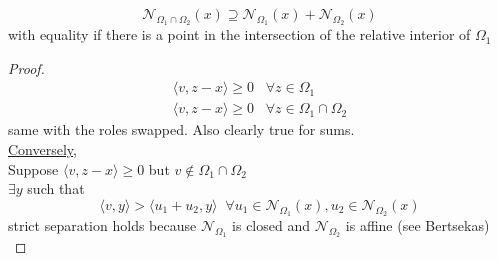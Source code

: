 
 
 


 
 
  \begin{proposition}
 $$ \mathcal{N}_{\Omega_1 \cap \Omega_2}(x) \supseteq \mathcal{N}_{\Omega_1}(x) + \mathcal{N}_{\Omega_2}(x)  $$
 with equality if there is  a point in the intersection of the relative interior of $\Omega_1$
  \end{proposition}
\begin{proof} 
\begin{align*}
\langle v, z - x \rangle \geq 0 \;\;\; \forall z \in \Omega_1\\
\langle v, z - x \rangle \geq 0 \;\;\; \forall z \in \Omega_1 \cap \Omega_2
\end{align*}
same with the roles swapped. Also clearly true for sums.\\
\underline{Conversely}, \\
Suppose $\langle v, z-x \rangle  \geq 0$ but $v \not \in  \Omega_1 \cap \Omega_2$\\
$\exists y$ such that $$\langle v,y \rangle > \langle u_1 + u_2, y \rangle \;\; \forall  u_1 \in \mathcal{N}_{\Omega_1}(x), u_2 \in \mathcal{N}_{\Omega_2}(x)$$
strict separation holds because $\mathcal{N}_{\Omega_1}$ is closed and $\mathcal{N}_{\Omega_2}$ is affine (see Bertsekas)\\
\end{proof}
